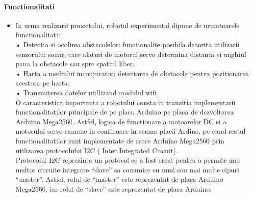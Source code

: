 \paragraph{\bf{Functionalitati}}
\begin{itemize}
\item
	\tab In urma realizarii proiectului, robotul experimental dipune de urmatoarele functionalitati:\\
•	Detectia si ocolirea obstacolelor: functionalite posibila datorita utilizarii senzorului sonar, care alaturi de motorul servo determina distanta si unghiul pana la obstacole sau spre spatiul liber.\\
•	Harta a mediului inconjurator:  detectarea de obstacole pentru pozitionarea acestora pe harta.\\
•	Transmiterea datelor utillizand modulul wifi.\\

	\tab O caracteristica importanta a robotului consta in tranzitia implementarii functionalitatilor principale de pe placa Arduino pe placa de dezvoltarea Arduino Mega2560. Astfel, logica de functionare a motoarelor DC si a motorului servo ramane in continuare in seama placii Ardino, pe cand restul functionalitatilor sunt implementate de catre Arduino Mega2560 prin utilizarea protocolului I2C ( Inter Integrated Circuit). \\
	\tab Protocolul I2C reprezinta un protocol ce a fost creat pentru a permite mai multor circuite integrate “slave” sa comunice cu unul sau mai multe cipuri “master”.  Astfel, rolul de “master” este reprezentat de placa  Arduino Mega2560, iar rolul de “slave” este reprezentat de placa Arduino.\\

\end{itemize}